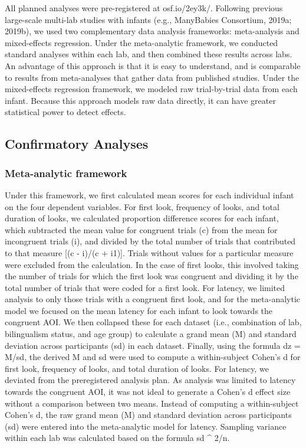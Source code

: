 \documentclass[,man,floatsintext]{apa6}
\begin{document}
All planned analyses were pre-registered at osf.io/2ey3k/. Following previous large-scale multi-lab studies with infants (e.g., ManyBabies Consortium, 2019a; 2019b), we used two complementary data analysis frameworks: meta-analysis and mixed-effects regression. Under the meta-analytic framework, we conducted standard analyses within each lab, and then combined these results across labs. An advantage of this approach is that it is easy to understand, and is comparable to results from meta-analyses that gather data from published studies. Under the mixed-effects regression framework, we modeled raw trial-by-trial data from each infant. Because this approach models raw data directly, it can have greater statistical power to detect effects.

\hypertarget{confirmatory-analyses}{%
\subsection{Confirmatory Analyses}\label{confirmatory-analyses}}

\hypertarget{meta-analytic-framework}{%
\subsubsection{Meta-analytic framework}\label{meta-analytic-framework}}

Under this framework, we first calculated mean scores for each individual infant on the four dependent variables. For first look, frequency of looks, and total duration of looks, we calculated proportion difference scores for each infant, which subtracted the mean value for congruent trials (c) from the mean for incongruent trials (i), and divided by the total number of trials that contributed to that measure {[}(c - i)/(c + i1){]}. Trials without values for a particular measure were excluded from the calculation. In the case of first looks, this involved taking the number of trials for which the first look was congruent and dividing it by the total number of trials that were coded for a first look. For latency, we limited analysis to only those trials with a congruent first look, and for the meta-analytic model we focused on the mean latency for each infant to look towards the congruent AOI. We then collapsed these for each dataset (i.e., combination of lab, bilingualism status, and age group) to calculate a grand mean (M) and standard deviation across participants (sd) in each dataset. Finally, using the formula dz = M/sd, the derived M and sd were used to compute a within-subject Cohen's d for first look, frequency of looks, and total duration of looks. For latency, we deviated from the preregistered analysis plan. As analysis was limited to latency towards the congruent AOI, it was not ideal to generate a Cohen's d effect size without a comparison between two means. Instead of computing a within-subject Cohen's d, the raw grand mean (M) and standard deviation across participants (sd) were entered into the meta-analytic model for latency. Sampling variance within each lab was calculated based on the formula sd \^{} 2/n.
\end{document}
